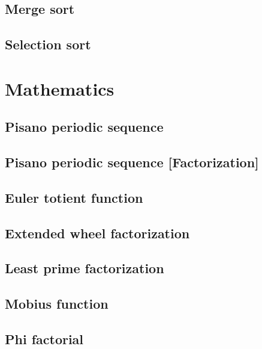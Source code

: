 \subsection{Merge sort}
\raggedbottom
\hrulefill
\subsection{Selection sort}
\raggedbottom
\hrulefill


\section{Mathematics}
\subsection{Pisano periodic sequence}
\raggedbottom
\hrulefill
\subsection{Pisano periodic sequence [Factorization]}
\raggedbottom
\hrulefill
\subsection{Euler totient function}
\raggedbottom
\hrulefill
\subsection{Extended wheel factorization}
\raggedbottom
\hrulefill
\subsection{Least prime factorization}
\raggedbottom
\hrulefill
\subsection{Mobius function}
\raggedbottom
\hrulefill
\subsection{Phi factorial}
\raggedbottom
\hrulefill
